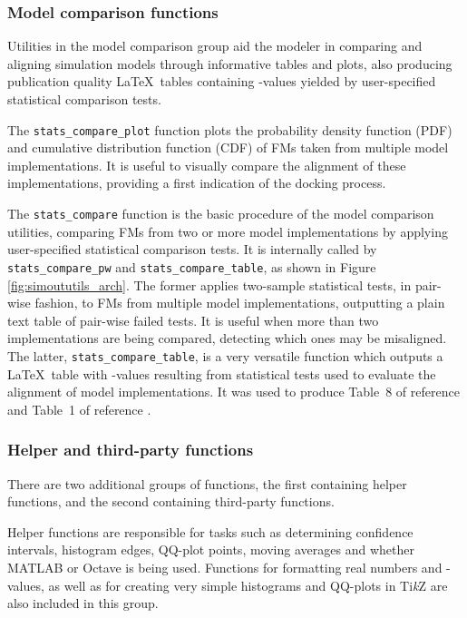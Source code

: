 \documentclass{article}
\newcommand{\progfunc}{\textnhtt}
\newcommand{\TikZ}{Ti\textit{k}Z\xspace}
\begin{document}
\subsubsection*{Model comparison functions}

Utilities in the model comparison group aid the modeler in comparing and aligning simulation models through informative tables and plots, also producing publication quality \LaTeX\ tables containing -values yielded by user-specified statistical comparison tests.

The \progfunc{stats\_compare\_plot} function plots the probability density function (PDF) and cumulative distribution function (CDF) of FMs taken from multiple model implementations. It is useful to visually compare the alignment of these implementations, providing a first indication of the docking process.

The \progfunc{stats\_compare} function is the basic procedure of the model comparison utilities, comparing FMs from two or more model implementations by applying user-specified statistical comparison tests. It is internally called by \progfunc{stats\_compare\_pw} and \progfunc{stats\_compare\_table}, as shown in Figure \ref{fig:simoututils_arch}. The former applies two-sample statistical tests, in pair-wise fashion, to FMs  from multiple model implementations, outputting a plain text table of pair-wise failed tests. It is useful when more than two implementations are being compared, detecting which ones may be misaligned. The latter, \progfunc{stats\_compare\_table}, is a very versatile function which outputs a \LaTeX\ table with -values resulting from statistical tests used to evaluate the alignment of model implementations. It was used to produce Table~8 of reference \cite{fachada2015parallelization} and Table~1 of reference \cite{fachada2015model}.

\subsubsection*{Helper and third-party functions}

There are two additional groups of functions, the first containing helper functions, and the second containing third-party functions.

Helper functions are responsible for tasks such as determining confidence intervals, histogram edges, QQ-plot points, moving averages and whether MATLAB or Octave is being used. Functions for formatting real numbers and -values, as well as for creating very simple histograms and QQ-plots in \TikZ \cite{tantau2013tikz} are also included in this group.
\end{document}

